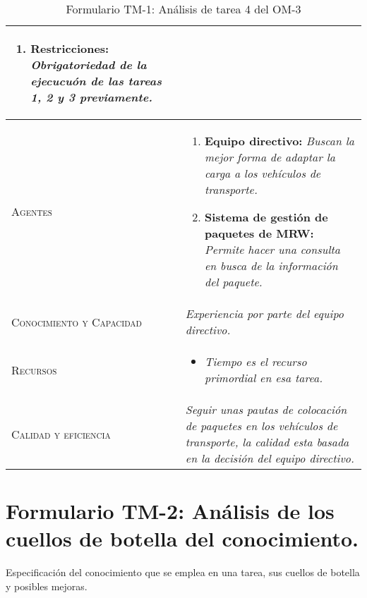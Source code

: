 \begin{table}[H]
{\begin{tabularx}{\textwidth}{|l|X|}
\begin{enumerate}
					\item \textbf{Restricciones:} \textit{Obrigatoriedad de la ejecucuón de las tareas 1, 2 y 3 previamente.}
				\end{enumerate} \\
			\hline
			\textsc{Agentes} & 
				\begin{enumerate}
					\item \textbf{Equipo directivo:} \textit{Buscan la mejor forma de adaptar la carga a los vehículos de transporte.}
					\item \textbf{Sistema de gestión de paquetes de MRW:} \textit{Permite hacer una consulta en busca de la información del paquete.}
				\end{enumerate} \\
			\hline
			\textsc{Conocimiento y Capacidad} & \textit{Experiencia por parte del equipo directivo.} \\
			\hline
			\textsc{Recursos} & 
				\begin{itemize}
					\item \textit{Tiempo es el recurso primordial en esa tarea.}
				\end{itemize} \\
			\hline
			\textsc{Calidad y eficiencia} & \textit{Seguir unas pautas de colocación de paquetes en los vehículos de transporte, la calidad esta basada en la decisión del equipo directivo.} \\
			\hline
		\end{tabularx}
	}
	\caption{\label{tab:TM1T4}Formulario TM-1: Análisis de tarea 4 del OM-3}
\end{table} 
\newpage

\section{Formulario TM-2: Análisis de los cuellos de botella del conocimiento.}
Especificación del conocimiento que se emplea en una tarea, sus cuellos de botella y posibles mejoras.


